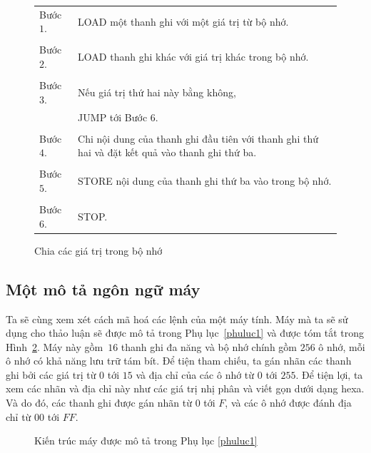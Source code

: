 \begin{figure}[tb]
  \begin{center}
    \begin{tabular}{m{2cm}m{7cm}}
      Bước $1$. & LOAD một thanh ghi với một giá trị từ bộ nhớ.         \\   \\

      Bước $2$. & LOAD thanh ghi khác với giá trị khác trong bộ nhớ.    \\   \\

      Bước $3$. & Nếu giá trị thứ hai này bằng không,                   \\
      & JUMP tới Bước $6$.                                    \\   \\

      Bước $4$. & Chi nội dung của thanh ghi đầu tiên với thanh ghi thứ hai   và đặt kết quả vào thanh ghi thứ ba.                              \\   \\

      Bước $5$. & STORE nội dung của thanh ghi thứ ba vào trong bộ nhớ. \\   \\

      Bước $6$. & STOP.
    \end{tabular}
  \end{center}
  \caption{Chia các giá trị trong bộ nhớ}
  \label{fig:fig23}

\end{figure}

\subsection*{Một mô tả ngôn ngữ máy}
Ta sẽ cùng xem xét cách mã hoá các lệnh của một máy tính. Máy mà ta sẽ sử dụng cho thảo
luận sẽ được mô tả trong Phụ lục~\ref{phuluc1} và được tóm tắt trong
Hình~\ref{fig:fig24}. Máy này gồm~$16$ thanh ghi đa năng và bộ nhớ chính gồm $256$ ô nhớ,
mỗi ô nhớ có khả năng lưu trữ tám bít. Để tiện tham chiếu, ta gán nhãn các thanh ghi bởi
các giá trị từ $0$ tới $15$ và địa chỉ của các ô nhớ từ $0$ tới $255$. Để tiện lợi, ta xem
các nhãn và địa chỉ này như các giá trị nhị phân và viết gọn dưới dạng hexa. Và do đó, các
thanh ghi được gán nhãn từ $0$ tới $F$, và các ô nhớ được đánh địa chỉ từ $00$ tới $FF$.

\begin{figure}[tbh]
  \centering {}
  \caption{Kiến trúc máy được mô tả trong Phụ lục \ref{phuluc1}}
  \label{fig:fig24}
\end{figure}

